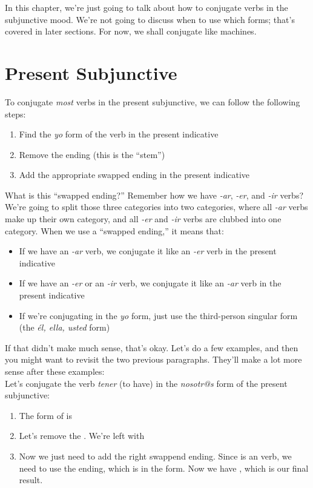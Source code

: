 In this chapter, we're just going to talk about how to conjugate verbs in the subjunctive mood. We're not going to discuss when to use which forms; that's covered in later sections. For now, we shall conjugate like machines. \\

\section{Present Subjunctive}
To conjugate \textit{most} verbs in the present subjunctive, we can follow the following steps:
\begin{enumerate}[noitemsep]
	\item Find the \textit{yo} form of the verb in the present indicative
	\item Remove the  ending (this is the ``stem'')
	\item Add the appropriate swapped ending in the present indicative
\end{enumerate}

What is this ``swapped ending?'' Remember how we have \textit{-ar}, \textit{-er}, and \textit{-ir} verbs? We're going to split those three categories into two categories, where all \textit{-ar} verbs make up their own category, and all \textit{-er} and \textit{-ir} verbs are clubbed into one category. When we use a ``swapped ending,'' it means that:
\begin{itemize}[noitemsep]
	\item If we have an \textit{-ar} verb, we conjugate it like an \textit{-er} verb in the present indicative
	\item If we have an \textit{-er} or an \textit{-ir} verb, we conjugate it like an \textit{-ar} verb in the present indicative
	\item If we're conjugating in the \textit{yo} form, just use the third-person singular form (the \textit{{\'{e}l, ella, usted}} form)
\end{itemize}

If that didn't make much sense, that's okay. Let's do a few examples, and then you might want to revisit the two previous paragraphs. They'll make a lot more sense after these examples: \\

Let's conjugate the verb \textit{tener} (to have) in the \textit{nosotr@s} form of the present subjunctive:
\begin{enumerate}[noitemsep]
	\item The  form of  is 
	\item Let's remove the . We're left with 
	\item Now we just need to add the right swappend ending. Since  is an  verb, we need to use the  ending, which is  in the  form. Now we have , which is our final result. 
\end{enumerate}

